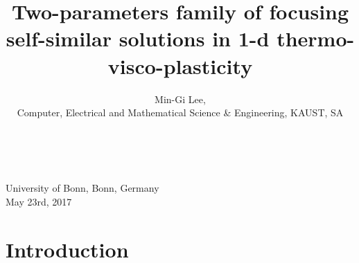 \documentclass{beamer}
\begin{document}
\title{\LARGE Two-parameters family of focusing self-similar solutions in 1-d thermo-visco-plasticity}
\author{\vskip 5pt \small {Min-Gi Lee},\\ \vskip 5pt \scriptsize Computer, Electrical and Mathematical Science \& Engineering, KAUST, SA\\}
\date{~}
\begin{frame}
  \titlepage
  \vskip -60pt
  \center
  {\small
  {\scriptsize University of Bonn, Bonn, Germany}\\
  {\scriptsize May 23rd, 2017}\\}
\end{frame}

\section{Introduction}
\end{document}
